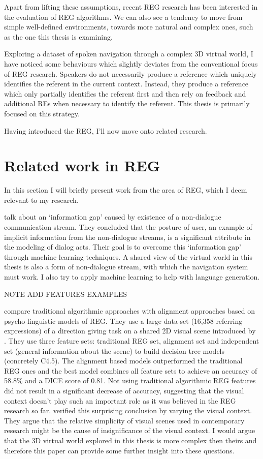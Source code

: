 Apart from lifting these assumptions, recent REG research has been interested in the evaluation of REG algorithms. We can also see a tendency to move from simple well-defined environments, towards more natural and complex ones, such as the one this thesis is examining.

Exploring a dataset of spoken navigation through a complex 3D virtual world, I have noticed some behaviours which slightly deviates from the conventional focus of REG research. Speakers do not necessarily produce a reference which uniquely identifies the referent in the current context. Instead, they produce a reference which only partially identifies the referent first and then rely on feedback and additional REs when necessary to identify the referent. This thesis is primarily focused on this strategy.

Having introduced the REG, I'll now move onto related research.

\section{Related work in REG}
\label{sec:relwork}
In this section I will briefly present work from the area of REG, which I deem relevant to my research.

\citet{ha2012combining} talk about an `information gap' caused by existence of a non-dialogue communication stream. They concluded that the posture of user, an example of implicit information from the non-dialogue streams, is a significant attribute in the modeling of dialog acts. Their goal is to overcome this `information gap' through machine learning techniques. A shared view of the virtual world in this thesis is also a form of non-dialogue stream, with which the navigation system must work. I also try to apply machine learning to help with language generation.

NOTE ADD FEATURES EXAMPLES

\citet{viethen2011generating} compare traditional algorithmic approaches with alignment approaches based on psycho-linguistic models of REG. They use a large data-set (16,358 referring expressions) of a direction giving task on a shared 2D visual scene introduced by \citet{louwerse2007multimodal}. They use three feature sets: traditional REG set, alignment set and independent set (general information about the scene) to build decision tree models (concretely C4.5). The alignment based models outperformed the traditional REG ones and the best model combines all feature sets to achieve an accuracy of 58.8\% and a DICE score of 0.81. Not using traditional algorithmic REG features did not result in a significant decrease of accuracy, suggesting that the visual context doesn't play such an important role as it was believed in the REG research so far.  \citet{viethen2011impact} verified this surprising conclusion by varying the visual context. They argue that the relative simplicity of visual scenes used in contemporary research might be the cause of insignificance of the visual context. I would argue that the 3D virtual world explored in this thesis is more complex then theirs and therefore this paper can provide some further insight into these questions.  

